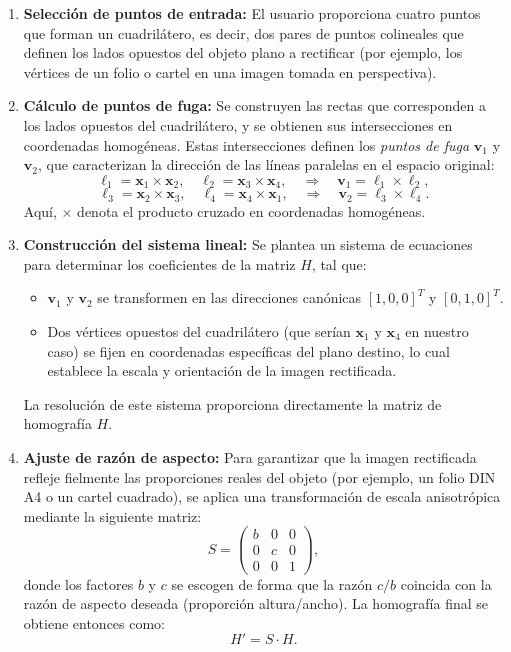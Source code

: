 \begin{enumerate}
    \item \textbf{Selección de puntos de entrada:} El usuario proporciona cuatro puntos que forman un cuadrilátero, es decir, dos pares de puntos colineales que definen los lados opuestos del objeto plano a rectificar (por ejemplo, los vértices de un folio o cartel en una imagen tomada en perspectiva).

    \item \textbf{Cálculo de puntos de fuga:} Se construyen las rectas que corresponden a los lados opuestos del cuadrilátero, y se obtienen sus intersecciones en coordenadas homogéneas. Estas intersecciones definen los \textit{puntos de fuga} \(\mathbf{v}_1\) y \(\mathbf{v}_2\), que caracterizan la dirección de las líneas paralelas en el espacio original:
    \[
    \ell_1 = \mathbf{x}_1 \times \mathbf{x}_2, \quad \ell_2 = \mathbf{x}_3 \times \mathbf{x}_4, \quad \Rightarrow \quad \mathbf{v}_1 = \ell_1 \times \ell_2,
    \]
    \[
    \ell_3 = \mathbf{x}_2 \times \mathbf{x}_3, \quad \ell_4 = \mathbf{x}_4 \times \mathbf{x}_1, \quad \Rightarrow \quad \mathbf{v}_2 = \ell_3 \times \ell_4.
    \]
    Aquí, \(\times\) denota el producto cruzado en coordenadas homogéneas.

    \item \textbf{Construcción del sistema lineal:} Se plantea un sistema de ecuaciones para determinar los coeficientes de la matriz \(H\), tal que:
    \begin{itemize}
        \item \(\mathbf{v}_1\) y \(\mathbf{v}_2\) se transformen en las direcciones canónicas \([1,0,0]^T\) y \([0,1,0]^T\).
        \item Dos vértices opuestos del cuadrilátero (que serían \(\mathbf{x}_1\) y \(\mathbf{x}_4\) en nuestro caso) se fijen en coordenadas específicas del plano destino, lo cual establece la escala y orientación de la imagen rectificada.
    \end{itemize}
    La resolución de este sistema proporciona directamente la matriz de homografía \(H\).

    \item \textbf{Ajuste de razón de aspecto:} Para garantizar que la imagen rectificada refleje fielmente las proporciones reales del objeto (por ejemplo, un folio DIN A4 o un cartel cuadrado), se aplica una transformación de escala anisotrópica mediante la siguiente matriz:
    \[
    S = 
    \begin{pmatrix}
    b & 0 & 0 \\
    0 & c & 0 \\
    0 & 0 & 1
    \end{pmatrix},
    \]
    donde los factores \(b\) y \(c\) se escogen de forma que la razón \(c/b\) coincida con la razón de aspecto deseada (proporción altura/ancho). La homografía final se obtiene entonces como:
    \[
    H' = S \cdot H.
    \]
\end{enumerate}

